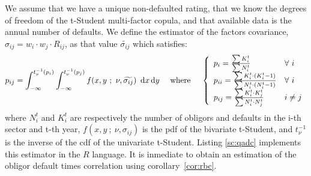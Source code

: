 \documentclass[11pt,fleqn]{book} %
\begin{document}
\begin{definition}
	We assume that we have a unique non-defaulted rating, that we know the 
	degrees of freedom of the t-Student multi-factor copula, and that available 
	data is the annual number of defaults. We define the estimator of the 
	factors covariance, $\sigma_{ij} = w_i \cdot w_j \cdot R_{ij}$, as that 
	value $\widetilde{\sigma_{ij}}$ which satisfies:
	\begin{displaymath}
		p_{ij} = \displaystyle \int_{-\infty}^{t_{\nu}^{-1}(p_i)} \int_{-\infty}^{t_{\nu}^{-1}(p_j)} 
		f(x,y\ ;\ \nu, \widetilde{\sigma_{ij}})\ \mathop{\mathrm{{}d}}\mathopen{} x \mathop{\mathrm{{}d}}\mathopen{} y
		\quad \text{ where } \quad
		\left\{
			\begin{array}{ll}
				p_i = \frac{\sum K_i^t}{\sum N_i^t} & \forall\ i \\
				p_{ii} = \frac{\sum K_i^t \cdot (K_i^t-1)}{\sum N_i^t \cdot (N_i^t-1)} & \forall\ i \\
				p_{ij} = \frac{\sum K_i^t \cdot K_j^t}{\sum N_i^t \cdot N_j^t} & i \ne j \\
			\end{array}
		\right.
	\end{displaymath}
	where $N_i^t$ and $K_i^t$ are respectively the number of obligors and 
	defaults in the i-th sector and t-th year, $f(x,y\ ;\ \nu,\sigma_{ij})$ 
	is the pdf of the bivariate t-Student, and $t_{\nu}^{-1}$ is the inverse 
	of the cdf of the univariate t-Student. Listing \ref{sc:qadc} implements 
	this estimator in the $R$ language. It is inmediate to obtain an estimation 
	of the obligor default times correlation using corollary~\ref{cor:rbc}.
\end{definition}
\end{document}
